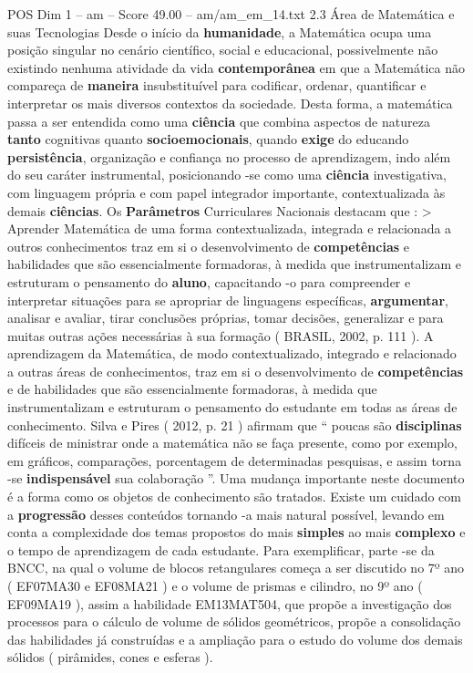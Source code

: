 \begin{textsample}{POS Dim 1 – am – Score 49.00 – am/am\_em\_14.txt}  \label{ex:f1_pos_225}
2.3 Área de Matemática e suas Tecnologias Desde o início da \textbf{humanidade}, a Matemática ocupa uma posição singular no cenário científico, social e educacional, possivelmente não existindo nenhuma atividade da vida \textbf{contemporânea} em que a Matemática não compareça de \textbf{maneira} insubstituível para codificar, ordenar, quantificar e interpretar os mais diversos contextos da sociedade.
Desta forma, a matemática passa a ser entendida como uma \textbf{ciência} que combina aspectos de natureza \textbf{tanto} cognitivas quanto \textbf{socioemocionais}, quando \textbf{exige} do educando \textbf{persistência}, organização e confiança no processo de aprendizagem, indo além do seu caráter instrumental, posicionando -se como uma \textbf{ciência} investigativa, com linguagem própria e com papel integrador importante, contextualizada às demais \textbf{ciências}.
Os \textbf{Parâmetros} Curriculares Nacionais destacam que : > Aprender Matemática de uma forma contextualizada, integrada e relacionada a outros conhecimentos traz em si o desenvolvimento de \textbf{competências} e habilidades que são essencialmente formadoras, à medida que instrumentalizam e estruturam o pensamento do \textbf{aluno}, capacitando -o para compreender e interpretar situações para se apropriar de linguagens específicas, \textbf{argumentar}, analisar e avaliar, tirar conclusões próprias, tomar decisões, generalizar e para muitas outras ações necessárias à sua formação ( BRASIL, 2002, p. 111 ).
A aprendizagem da Matemática, de modo contextualizado, integrado e relacionado a outras áreas de conhecimentos, traz em si o desenvolvimento de \textbf{competências} e de habilidades que são essencialmente formadoras, à medida que instrumentalizam e estruturam o pensamento do estudante em todas as áreas de conhecimento.
Silva e Pires ( 2012, p. 21 ) afirmam que “ poucas são \textbf{disciplinas} difíceis de ministrar onde a matemática não se faça presente, como por exemplo, em gráficos, comparações, porcentagem de determinadas pesquisas, e assim torna -se \textbf{indispensável} sua colaboração ”.
Uma mudança importante neste documento é a forma como os objetos de conhecimento são tratados.
Existe um cuidado com a \textbf{progressão} desses conteúdos tornando -a mais natural possível, levando em conta a complexidade dos temas propostos do mais \textbf{simples} ao mais \textbf{complexo} e o tempo de aprendizagem de cada estudante.
Para exemplificar, parte -se da BNCC, na qual o volume de blocos retangulares começa a ser discutido no 7º ano ( EF07MA30 e EF08MA21 ) e o volume de prismas e cilindro, no 9º ano ( EF09MA19 ), assim a habilidade EM13MAT504, que propõe a investigação dos processos para o cálculo de volume de sólidos geométricos, propõe a consolidação das habilidades já construídas e a ampliação para o estudo do volume dos demais sólidos ( pirâmides, cones e esferas ).

\end{textsample}
